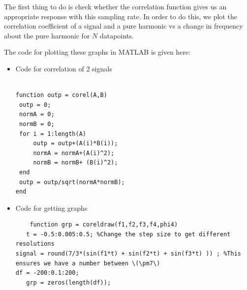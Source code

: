 The first thing to do is check whether the correlation function gives us an
appropriate response with this sampling rate. In order to do this, we plot the
correlation coefficient of a signal and a pure harmonic vs a change in frequency
about the pure harmonic for \(N\) datapoints. 

The code for plotting these graphs in MATLAB is given here: \\
\begin{itemize}
    \item Code for correlation of 2 signals
\begin{lstlisting}
    
function outp = corel(A,B)
 outp = 0;
 normA = 0;
 normB = 0;
 for i = 1:length(A)
     outp = outp+(A(i)*B(i));
     normA = normA+(A(i)^2);
     normB = normB+ (B(i)^2);
 end
 outp = outp/sqrt(normA*normB);
end
\end{lstlisting} 

\item Code for getting graphs
\begin{lstlisting}
    function grp = coreldraw(f1,f2,f3,f4,phi4)
   t = -0.5:0.005:0.5; %Change the step size to get different resolutions
signal = round(7/3*(sin(f1*t) + sin(f2*t) + sin(f3*t) )) ; %This ensures we have a number between \(\pm7\)
df = -200:0.1:200;
   grp = zeros(length(df));


\end{lstlisting}
\end{itemize}
